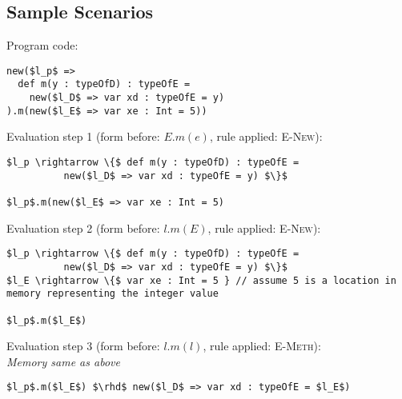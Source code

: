 \documentclass{llncs}
\begin{document}
\newpage

\subsection{Sample Scenarios}

\noindent\underline{}

\vspace{16pt}

\noindent Program code:
\vspace{-6pt}
\begin{lstlisting}[xleftmargin=20pt]
new($l_p$ =>
  def m(y : typeOfD) : typeOfE =
    new($l_D$ => var xd : typeOfE = y)
).m(new($l_E$ => var xe : Int = 5))
\end{lstlisting}

\vspace{12pt}
\noindent Evaluation step 1 (form before: $E.m(e)$, rule applied: \textsc{E-New}):
\vspace{-6pt}
\begin{lstlisting}[xleftmargin=20pt]
$l_p \rightarrow \{$ def m(y : typeOfD) : typeOfE =
          new($l_D$ => var xd : typeOfE = y) $\}$

$l_p$.m(new($l_E$ => var xe : Int = 5)
\end{lstlisting}

\vspace{12pt}
\noindent Evaluation step 2 (form before: $l.m(E)$, rule applied: \textsc{E-New}):
\vspace{-6pt}
\begin{lstlisting}[xleftmargin=20pt]
$l_p \rightarrow \{$ def m(y : typeOfD) : typeOfE =
          new($l_D$ => var xd : typeOfE = y) $\}$
$l_E \rightarrow \{$ var xe : Int = 5 } // assume 5 is a location in memory representing the integer value

$l_p$.m($l_E$)
\end{lstlisting}

\vspace{12pt}
\noindent Evaluation step 3 (form before: $l.m(l)$, rule applied: \textsc{E-Meth}):\\
\vspace{-6pt}
\indent\textit{Memory same as above}\\
\vspace{-6pt}
\begin{lstlisting}[xleftmargin=20pt]
$l_p$.m($l_E$) $\rhd$ new($l_D$ => var xd : typeOfE = $l_E$)
\end{lstlisting}
\end{document}
